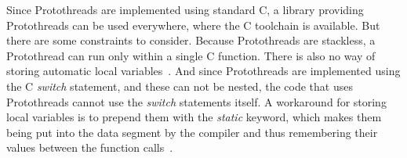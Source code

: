 Since Protothreads are implemented using standard C, a library providing Protothreads can be used everywhere,
where the C toolchain is available.
But there are some constraints to consider.
Because Protothreads are stackless, a Protothread can run only within a single C function. %
There is also no way of storing automatic local variables~\cite{contiki-docs}. %
And since Protothreads are implemented using the C {\it switch} statement, and these can %
not be nested, the code that uses Protothreads cannot use the {\it switch} statements itself.
A workaround for storing local variables is to prepend them with the {\it static} keyword,
which makes them being put into the data segment %
by the compiler and thus remembering their values between the function calls~\cite{paper-protothreads}.
